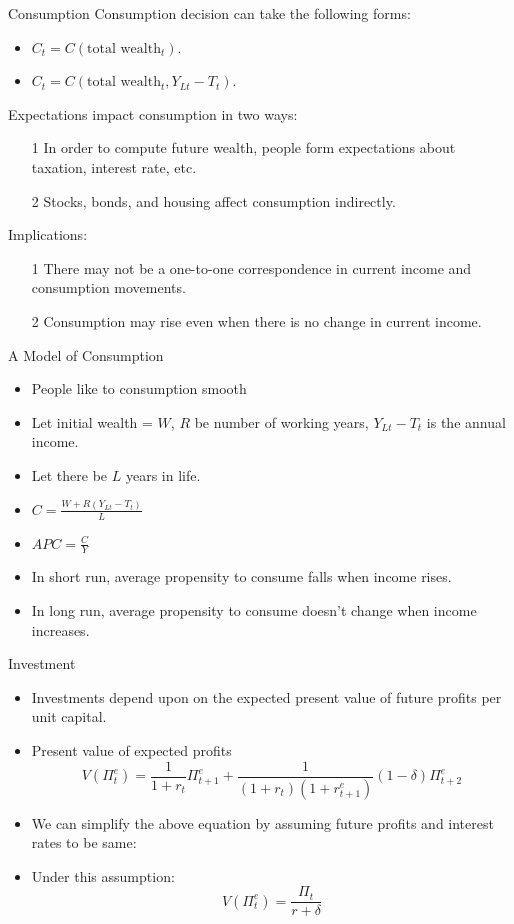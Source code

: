 \documentclass[shownotes,11pt, aspectratio=169]{beamer}
\begin{document}
\begin{frame}{Consumption}
Consumption decision can take the following forms: 
\begin{itemize}
\item $C_t = C(\text{total wealth}_t)$.
\item $C_t = C(\text{total wealth}_t, Y_{Lt} - T_t)$.
\end{itemize}
\pause
Expectations impact consumption in two ways:
\begin{itemize}
\item[1] In order to compute future wealth, people form expectations about taxation, interest rate, etc.
\item[2] Stocks, bonds, and housing affect consumption indirectly.
\end{itemize}
\pause
\vspace{2mm}
Implications:
\begin{itemize}
\item[1] There may not be a one-to-one correspondence in current income and consumption movements.
\item[2] Consumption may rise even when there is no change in current income.
\end{itemize}
\end{frame}

\begin{frame}{A Model of Consumption}
\begin{itemize}
\item People like to consumption smooth
\item Let initial wealth = $W$, $R$ be number of working years, $Y_{Lt} - T_t$ is the annual income.
\item Let there be $L$ years in life.
\item $C = \frac{W + R(Y_{Lt} - T_t)}{L}$
\pause
\item $APC = \frac{C}{Y}$
\pause
\item In short run, average propensity to consume falls when income rises.
\item In long run, average propensity to consume doesn't change when income increases.
\end{itemize}
\end{frame}

\begin{frame}{Investment}
\begin{itemize}
\item Investments depend upon on the expected present value of future profits per unit capital.
\pause 
\item Present value of expected profits
     \[ V(\Pi_{t}^e) = \frac{1}{1 + r_t}\Pi_{t+1}^e + \frac{1}{(1 + r_{t})(1 + r_{t+1}^e)}(1 - \delta)\Pi_{t+2}^e \]
\pause
\item We can simplify the above equation by assuming future profits and interest rates to be same:
\pause
\item Under this assumption:
      \[ V(\Pi_t^e) = \frac{\Pi_t}{r + \delta} \]
\end{itemize}
\end{frame}
\end{document}
